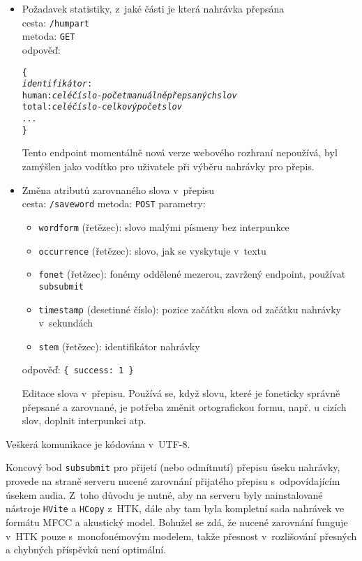\begin{itemize}
{    Slouží k~detekci začátku práce na přepisech pro účely sledování času
    potřebného k~přepisům.
}
\item{
    Požadavek statistiky, z~jaké části je která nahrávka přepsána \\
    cesta: \texttt{/humpart} \\
    metoda: \texttt{GET} \\
    odpověď: \begin{alltt}\{
        {\em identifikátor}:
            human: {\em celé číslo - počet manuálně přepsaných slov}
            total: {\em celé číslo - celkový počet slov}
        {\em ...}
    \}\end{alltt}

    Tento endpoint momentálně nová verze webového rozhraní nepoužívá, byl
    zamýšlen jako vodítko pro uživatele při výběru nahrávky pro přepis.
}
\item{
    Změna atributů zarovnaného slova v~přepisu \\
    cesta: \texttt{/saveword}
    metoda: \texttt{POST}
    parametry:
    \begin{itemize}
        \item{\texttt{wordform} (řetězec): slovo malými písmeny bez interpunkce}
        \item{\texttt{occurrence} (řetězec): slovo, jak se vyskytuje v~textu}
        \item{\texttt{fonet} (řetězec): fonémy oddělené mezerou, zavržený endpoint, používat \texttt{subsubmit}}
        \item{\texttt{timestamp} (desetinné číslo): pozice začátku slova od začátku nahrávky v~sekundách}
        \item{\texttt{stem} (řetězec): identifikátor nahrávky}
    \end{itemize}
    odpověď: \texttt{\{ success: 1 \}}

    Editace slova v~přepisu. Používá se, když slovu, které je foneticky správně
    přepsané a zarovnané, je potřeba změnit ortografickou formu, např. u cizích
    slov, doplnit interpunkci atp.
}
\end{itemize}

Veškerá komunikace je kódována v~UTF-8.

Koncový bod \texttt{subsubmit} pro přijetí (nebo odmítnutí) přepisu úseku
nahrávky, provede na straně serveru nucené zarovnání přijatého přepisu
s~odpovídajícím úsekem audia. Z~toho důvodu je nutné, aby na serveru byly
nainstalované nástroje \texttt{HVite} a \texttt{HCopy} z~HTK, dále aby tam byla
kompletní sada nahrávek ve formátu MFCC a akustický model. Bohužel se zdá, že
nucené zarovnání funguje v~HTK pouze s~monofonémovým modelem, takže přesnost
v~rozlišování přesných a chybných příspěvků není optimální.

